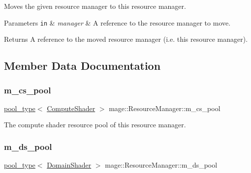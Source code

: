 Moves the given resource manager to this resource manager.


\begin{DoxyParams}[1]{Parameters}
\mbox{\tt in}  & {\em manager} & A reference to the resource manager to move. \\
\hline
\end{DoxyParams}
\begin{DoxyReturn}{Returns}
A reference to the moved resource manager (i.\+e. this resource manager). 
\end{DoxyReturn}


\subsection{Member Data Documentation}
\hypertarget{classmage_1_1_resource_manager_a1af8cfdf9fbde3d3ed135fea32330ea1}{}\label{classmage_1_1_resource_manager_a1af8cfdf9fbde3d3ed135fea32330ea1} 
\subsubsection{\texorpdfstring{m\+\_\+cs\+\_\+pool}{m\_cs\_pool}}
{\footnotesize\ttfamily \hyperlink{classmage_1_1_resource_manager_a4416f0a710790d8aa2d0bc006764695a}{pool\+\_\+type}$<$ \hyperlink{namespacemage_ae040329401484b076f0cd1a7c43d19c9}{Compute\+Shader} $>$ mage\+::\+Resource\+Manager\+::m\+\_\+cs\+\_\+pool\hspace{0.3cm}{\ttfamily [private]}}

The compute shader resource pool of this resource manager. \hypertarget{classmage_1_1_resource_manager_a75da17496bfee1396d5f99c4b2f6534f}{}\label{classmage_1_1_resource_manager_a75da17496bfee1396d5f99c4b2f6534f} 
\subsubsection{\texorpdfstring{m\+\_\+ds\+\_\+pool}{m\_ds\_pool}}
{\footnotesize\ttfamily \hyperlink{classmage_1_1_resource_manager_a4416f0a710790d8aa2d0bc006764695a}{pool\+\_\+type}$<$ \hyperlink{namespacemage_aef8cda73e2387cb89baa6c54a7fea542}{Domain\+Shader} $>$ mage\+::\+Resource\+Manager\+::m\+\_\+ds\+\_\+pool\hspace{0.3cm}{\ttfamily [private]}}

